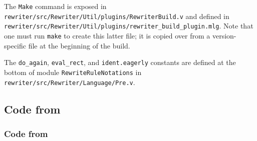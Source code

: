 \documentclass[a4paper,USenglish,cleveref,autoref,thm-restate]{lipics-v2021}
\begin{document}
The \texttt{Make} command is exposed in \texttt{rewriter/src/Rewriter/Util/plugins/RewriterBuild.v} and defined in \texttt{rewriter/src/Rewriter/Util/plugins/rewriter\_build\_plugin.mlg}.
Note that one must run \texttt{make} to create this latter file; it is copied over from a version-specific file at the beginning of the build.

\label{sec:code:eval-rect}%
\label{sec:code:ident.eagerly}%
The \verb|do_again|, \verb|eval_rect|, and \verb|ident.eagerly| constants are defined at the bottom of module \verb|RewriteRuleNotations| in \texttt{rewriter/src/Rewriter/Language/Pre.v}.

\subsection{Code from }


\subsubsection{Code from }\label{sec:code:nine-steps}
\end{document}
